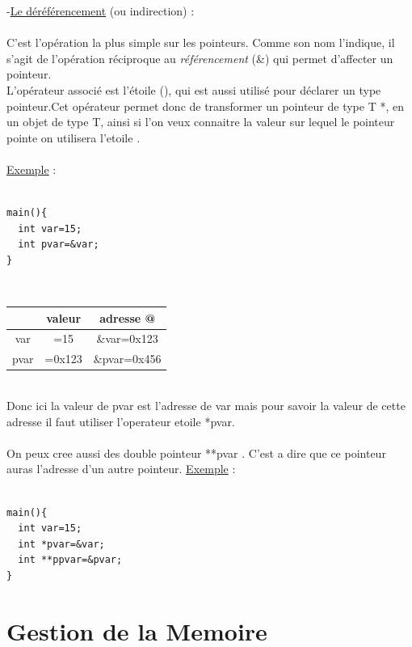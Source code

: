 \documentclass[a4paper,12pt,openany]{book}
\begin{document}
-\underline{Le d\'er\'ef\'erencement} (ou indirection) :\\
\\
C'est l'op\'eration la plus simple sur les pointeurs. Comme son nom l'indique, il s'agit de l'opération réciproque au 
\emph{référencement} (\&) qui permet d'affecter un pointeur.\\ L'opérateur associé est l'étoile (\*), qui est aussi utilisé pour déclarer un type pointeur.Cet opérateur permet donc de transformer un pointeur de type T *, en un objet de type T, ainsi si l'on veux connaitre la valeur sur lequel le pointeur pointe on utilisera l'etoile .\\
\\
\underline{Exemple} :\\
\\
\begin{verbatim}
main(){
  int var=15;
  int pvar=&var;
}
\end{verbatim}
\\
\begin{tabular}{|c|c|c|}
\hline
 & valeur & adresse @ \\ \hline
var & =15 & \&var=0x123 \\ \hline
pvar & =0x123 & \&pvar=0x456 \\ \hline
\end{tabular}
\\
Donc ici la valeur de pvar est l'adresse de var mais pour savoir la valeur de cette adresse il faut utiliser l'operateur etoile *pvar.\\
\\
On peux cree aussi des double pointeur **pvar . C'est a dire que ce pointeur auras l'adresse d'un autre pointeur. \underline{Exemple} :\\
\\
\begin{verbatim}
main(){
  int var=15;
  int *pvar=&var;
  int **ppvar=&pvar;
}
\end{verbatim}





\section{Gestion de la Memoire}
\end{document}
